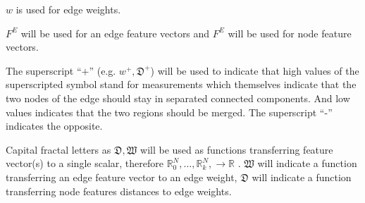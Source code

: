 \begin{compactitem}
    \item $w$ is used for edge weights.
    \item $F^E$ will be used for an edge feature vectors and $F^E$ will be used
        for node feature vectors.
    \item The superscript ``$+$'' (e.g. $w^+,\mathfrak{D}^+$) will be used to indicate 
        that high values of the superscripted symbol stand for
        measurements which themselves indicate that the two nodes of the edge should stay in separated
        connected components. And low values indicates that the two regions should be merged.
        The superscript ``-'' indicates the opposite.

    \item Capital fractal letters as $\mathfrak{D,W}$ will be used as
        functions transferring feature vector(s) to a single scalar, 
        therefore $\mathbb{R}_0^N,\ldots,\mathbb{R}_k^N, \rightarrow \mathbb{R} $ .
        $\mathfrak{W}$ will indicate a function transferring an edge feature
        vector to an edge weight, $\mathfrak{D}$ will indicate a function transferring 
        node features distances to edge weights.
\end{compactitem}





